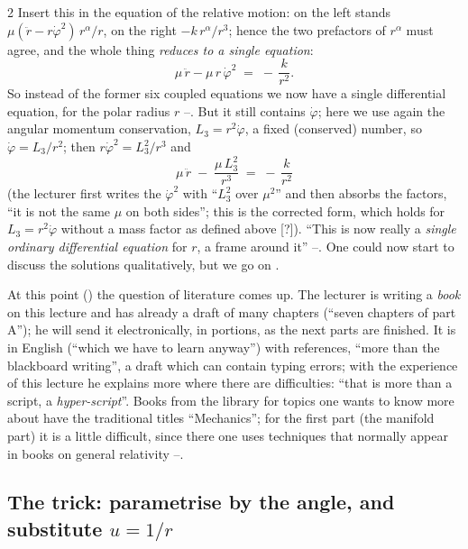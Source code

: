 \begin{paracol}{2}
Insert this in the equation of the relative motion: on the left stands $\mu(\ddot r-r\dot\varphi^2)\,r^\alpha/r$, on the right $-k\,r^\alpha/r^3$; hence the two prefactors of $r^\alpha$ must agree, and the whole thing \emph{reduces to a single equation}:
\begin{equation}\label{eq:tb-rad1}
  \mu\,\ddot r-\mu\,r\,\dot\varphi^2\;=\;-\,\frac{k}{r^2}.
\end{equation}
So instead of the former six coupled equations we now have a single differential equation, for the polar radius $r$ --. But it still contains $\dot\varphi$; here we use again the angular momentum conservation, $L_3=r^2\dot\varphi$, a fixed (conserved) number, so $\dot\varphi=L_3/r^2$; then $r\dot\varphi^2=L_3^2/r^3$ and
\begin{equation}\label{eq:tb-rad}
  \mu\,\ddot r\;-\;\frac{\mu\,L_3^2}{r^3}\;=\;-\,\frac{k}{r^2}
\end{equation}
(the lecturer first writes the $\dot\varphi^2$ with ``$L_3^2$ over $\mu^2$'' and then absorbs the factors, ``it is not the same $\mu$ on both sides''; this is the corrected form, which holds for $L_3=r^2\dot\varphi$ without a mass factor as defined above [?]). ``This is now really a \emph{single ordinary differential equation} for $r$, a frame around it''
--. One could now start to discuss the solutions qualitatively, but we go on .

\begin{coursenote}\label{cn:tb-lit}
At this point () the question of literature comes up. The lecturer is writing a \emph{book} on this lecture and has already a draft of many chapters (``seven chapters of part A''); he will send it electronically, in portions, as the next parts are finished. It is in English (``which we have to learn anyway'') with references, ``more than the blackboard writing'', a draft which can contain typing errors; with the experience of this lecture he explains more where there are difficulties: ``that is more than a script, a \emph{hyper-script}''.
Books from the library for topics one wants to know more about have the traditional titles ``Mechanics''; for the first part (the manifold part) it is a little difficult, since there one uses techniques that normally appear in books on general relativity --.
\end{coursenote}

\subsection{The trick: parametrise by the angle, and substitute $u=1/r$}\label{ssec:tb-trick}


\end{paracol}
